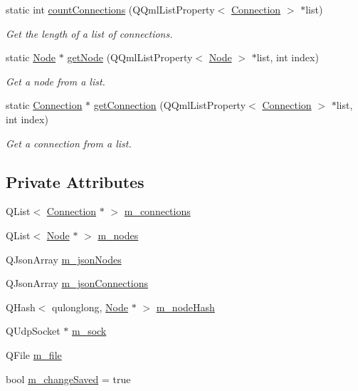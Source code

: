 \begin{DoxyCompactItemize}
static int \mbox{\hyperlink{classRoom_aaf0c2179afdb30a0a76fb926b403a19b}{count\+Connections}} (Q\+Qml\+List\+Property$<$ \mbox{\hyperlink{classConnection}{Connection}} $>$ $\ast$list)
\begin{DoxyCompactList}\small\item\em Get the length of a list of connections. \end{DoxyCompactList}\item 
static \mbox{\hyperlink{classNode}{Node}} $\ast$ \mbox{\hyperlink{classRoom_a89d62f69e6278b5d725b4c15ab21e12c}{get\+Node}} (Q\+Qml\+List\+Property$<$ \mbox{\hyperlink{classNode}{Node}} $>$ $\ast$list, int index)
\begin{DoxyCompactList}\small\item\em Get a node from a list. \end{DoxyCompactList}\item 
static \mbox{\hyperlink{classConnection}{Connection}} $\ast$ \mbox{\hyperlink{classRoom_a5a32e38ec8c82987fb99e70106ed6fdc}{get\+Connection}} (Q\+Qml\+List\+Property$<$ \mbox{\hyperlink{classConnection}{Connection}} $>$ $\ast$list, int index)
\begin{DoxyCompactList}\small\item\em Get a connection from a list. \end{DoxyCompactList}\end{DoxyCompactItemize}
\subsection*{Private Attributes}
\begin{DoxyCompactItemize}
\item 
Q\+List$<$ \mbox{\hyperlink{classConnection}{Connection}} $\ast$ $>$ \mbox{\hyperlink{classRoom_ad63f36cb6664087c6c74dddeb032e711}{m\+\_\+connections}}
\item 
Q\+List$<$ \mbox{\hyperlink{classNode}{Node}} $\ast$ $>$ \mbox{\hyperlink{classRoom_ab5be7998bc742a4bf931c81f044d7aae}{m\+\_\+nodes}}
\item 
Q\+Json\+Array \mbox{\hyperlink{classRoom_a98b8568422738036941daf95be83a9e3}{m\+\_\+json\+Nodes}}
\item 
Q\+Json\+Array \mbox{\hyperlink{classRoom_a9d19c870844f064eb724412ec10ef7f2}{m\+\_\+json\+Connections}}
\item 
Q\+Hash$<$ qulonglong, \mbox{\hyperlink{classNode}{Node}} $\ast$ $>$ \mbox{\hyperlink{classRoom_ace06dd46446e3ca79533f99b1723cf97}{m\+\_\+node\+Hash}}
\item 
Q\+Udp\+Socket $\ast$ \mbox{\hyperlink{classRoom_a726013d07c3e655f21822f720a89cea7}{m\+\_\+sock}}
\item 
Q\+File \mbox{\hyperlink{classRoom_a66ea178fb6c6c69842498b87abac816a}{m\+\_\+file}}
\item 
bool \mbox{\hyperlink{classRoom_aa6a3c11ef8f5d0253f4ddb763cfc3f53}{m\+\_\+change\+Saved}} = true
\end{DoxyCompactItemize}


